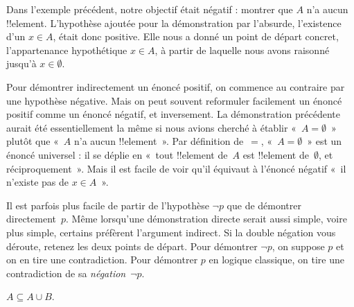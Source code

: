 \documentclass[../../../include/open-logic-section]{subfiles}
\begin{document}
Dans l'exemple précédent, notre objectif
était négatif : montrer que $A$ n'a
aucun !!{element}. L'hypothèse ajoutée
pour la démonstration par l'absurde,
l'existence d'un $x \in A$, était
donc positive. Elle nous a donné
un point de départ concret,
l'appartenance hypothétique $x \in A$,
à partir de laquelle nous avons
raisonné jusqu'à $x \in \emptyset$.

Pour démontrer indirectement un énoncé
positif, on commence au contraire par
une hypothèse négative. Mais on peut
souvent reformuler facilement un énoncé
positif comme un énoncé négatif, et
inversement. La démonstration précédente
aurait été essentiellement la même si
nous avions cherché à établir
«~$A = \emptyset$~» plutôt que
«~$A$ n'a aucun !!{element}~».
Par définition de~$=$,
«~$A = \emptyset$~» est un énoncé
universel : il se déplie en
«~tout !!{element} de~$A$ est
!!{element} de~$\emptyset$,
et réciproquement~».
Mais il est facile de voir qu'il
équivaut à l'énoncé négatif
«~il n'existe pas de $x \in A$~».

Il est parfois plus facile de partir
de l'hypothèse $\lnot p$ que de
démontrer directement~$p$. Même
lorsqu'une démonstration directe serait
aussi simple, voire plus simple,
certains préfèrent l'argument indirect.
Si la double négation vous déroute,
retenez les deux points de départ.
Pour démontrer $\lnot p$, on suppose
$p$ et on en tire une contradiction.
Pour démontrer $p$ en logique classique,
on tire une contradiction de sa
\emph{négation}~$\lnot p$.

\begin{prop}
$A \subseteq A \cup B$.
\end{prop}
\end{document}
